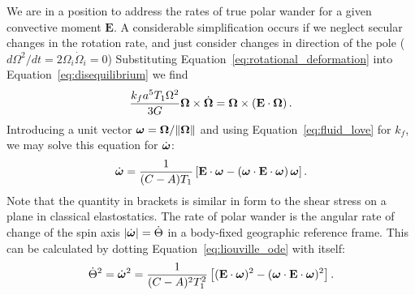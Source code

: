 \documentclass[extra,mreferee]{gji}
\begin{document}
We are in a position to address the rates of true polar wander for a given convective moment $\mathbf{E}$.
A considerable simplification occurs if we neglect secular changes in the rotation rate, and just consider changes in direction of the pole ($d \Omega^2 / dt = 2 {\Omega_i} \dot{ \Omega}_i = 0$)
Substituting Equation~\eqref{eq:rotational_deformation} into Equation~\eqref{eq:disequilibrium} we find
\begin{equation}
\frac{k_f a^5 T_1 \Omega^2}{3G}\mitbf{\Omega} \times \dot{\mitbf{\Omega} } = \mitbf{\Omega} \times \left( \mathbf{E} \cdot \mitbf{\Omega} \right).
\label{eq:liouville}
\end{equation}
Introducing a unit vector $\mitbf{\omega} = \mitbf{\Omega}/\|\mitbf{\Omega} \|$ and using Equation~\eqref{eq:fluid_love} for $k_f$,  we may solve this equation for $\dot{\mitbf{\omega}}$:
\begin{equation}
 \dot{\mitbf{\omega}}  = \frac{1}{(C-A)T_1} \left[ \mathbf{E} \cdot \mitbf{\omega} - \left( \mitbf{\omega} \cdot \mathbf{E} \cdot \mitbf{\omega}  \right) \mitbf{\omega} \right].
\label{eq:liouville_ode}
\end{equation}
Note that the quantity in brackets is similar in form to the shear stress on a plane in classical elastostatics.
The rate of polar wander is the angular rate of change of the spin axis $\left| \dot{\mitbf{\omega}} \right| = \dot{\Theta}$ in a body-fixed geographic reference frame.
This can be calculated by dotting Equation~\eqref{eq:liouville_ode} with itself:
\begin{equation}
\dot{\Theta}^2 = \dot{\mitbf{\omega}}^2 = \frac{1}{(C-A)^2 T_1^2} \left[ (\mathbf{E}\cdot\mitbf{\omega})^2 - (\mitbf{\omega}\cdot\mathbf{E}\cdot\mitbf{\omega})^2 \right].
\label{eq:polar_wander_rate_tensor}
\end{equation}
\end{document}
